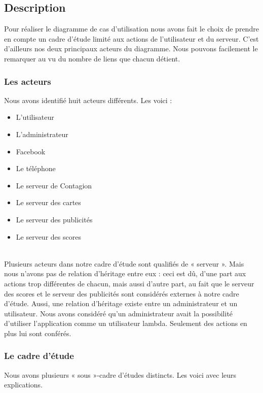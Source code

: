\documentclass[11pt,a4paper]{article}
\begin{document}
\newpage

\pagestyle{fancy}
\fancyhead{}
\renewcommand{\headrulewidth}{0pt}

\subsection{Description}

Pour réaliser le diagramme de cas d’utilisation nous
avons fait le choix de prendre en compte un cadre d’étude
limité aux actions de l’utilisateur et du serveur. C’est
d’ailleurs nos deux principaux acteurs du diagramme. Nous
pouvons facilement le remarquer au vu du nombre de liens
que chacun détient.

\subsubsection{Les acteurs}

Nous avons identifié huit acteurs différents. Les voici : 

\begin{itemize}
	\item L’utilisateur
	\item L’administrateur
	\item Facebook
	\item Le téléphone
	\item Le serveur de Contagion
	\item Le serveur des cartes
	\item Le serveur des publicités
	\item Le serveur des scores
\end{itemize}

~\\

Plusieurs acteurs dans notre cadre d’étude sont qualifiés
de « serveur ». Mais nous n’avons pas de relation
d’héritage entre eux : ceci est dû, d’une part aux actions
trop différentes de chacun, mais aussi d’autre part, au
fait que le serveur des scores et le serveur des
publicités sont considérés externes à notre cadre d’étude.
Aussi, une relation d’héritage existe entre un
administrateur et un utilisateur. Nous avons considéré
qu’un administrateur avait la possibilité d’utiliser
l’application comme un utilisateur lambda. Seulement des
actions en plus lui sont conférés.

\subsubsection{Le cadre d'étude}
Nous avons plusieurs « sous »-cadre d’études distincts. Les voici avec leurs explications.
\end{document}
